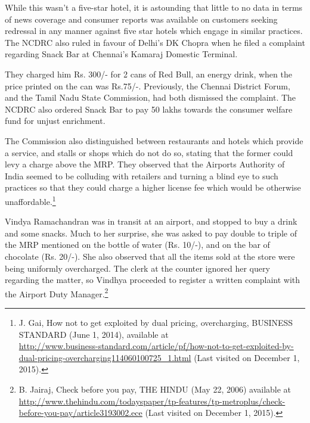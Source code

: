 \begin{multicols}{2}
\vspace{-.15cm}

\noi
While this wasn’t a five-star hotel, it is astounding that little to no data in terms of news
coverage and consumer reports was available on customers seeking redressal in any manner
against five star hotels which engage in similar practices. The NCDRC also ruled in favour of
Delhi’s DK Chopra when he filed a complaint regarding Snack Bar at Chennai’s Kamaraj
Domestic Terminal.

\vspace{-.15cm}

\noi
They charged him Rs. 300/- for 2 cans of Red Bull, an energy drink, when the price printed on
the can was Rs.75/-. Previously, the Chennai District Forum, and the Tamil Nadu State
Commission, had both dismissed the complaint. The NCDRC also ordered Snack Bar to pay
50 lakhs towards the consumer welfare fund for unjust enrichment.

\vspace{-.15cm}

\noi
The Commission also distinguished between restaurants and hotels which provide a service,
and stalls or shops which do not do so, stating that the former could levy a charge above the
MRP. They observed that the Airports Authority of India seemed to be colluding with retailers
and turning a blind eye to such practices so that they could charge a higher license fee which
would be otherwise unaffordable.\footnote{J. Gai, How not to get exploited by dual pricing, overcharging, BUSINESS STANDARD (June 1, 2014), available at\\ \url{http://www.business-standard.com/article/pf/how-not-to-get-exploited-by-dual-pricing-overcharging114060100725_1.html} (Last visited on December 1, 2015).}

\newpage
\noi
Vindya Ramachandran was in transit at an airport, and stopped to buy a drink and some snacks.
Much to her surprise, she was asked to pay double to triple of the MRP mentioned on the bottle
of water (Rs. 10/-), and on the bar of chocolate (Rs. 20/-). She also observed that all the items
sold at the store were being uniformly overcharged. The clerk at the counter ignored her query
regarding the matter, so Vindhya proceeded to register a written complaint with the Airport
Duty Manager.\footnote{B. Jairaj, Check before you pay, THE HINDU (May 22, 2006) available at \url{http://www.thehindu.com/todayspaper/tp-features/tp-metroplus/check-before-you-pay/article3193002.ece} (Last visited on December 1, 2015).}


\end{multicols}
